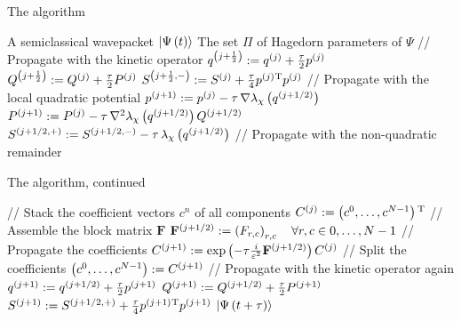 \documentclass{beamer}
\begin{document}
\begin{frame}{The algorithm}
  \begin{algorithmic}
    \REQUIRE A semiclassical wavepacket $\Ket{\Psi\left( t \right)}$
    \REQUIRE The set $\Pi$ of Hagedorn parameters of $\Psi$
    \STATE // Propagate with the kinetic operator
    \STATE $q^{\left(j+\frac{1}{2}\right)} := q^{\left(j\right)} + \frac{\tau}{2} p^{\left(j\right)}$
    \STATE $Q^{\left(j+\frac{1}{2}\right)} := Q^{\left(j\right)} + \frac{\tau}{2} P^{\left(j\right)}$
    \STATE $S^{\left(j+\frac{1}{2},-\right)} := S^{\left(j\right)} + \frac{\tau}{4} p^{\left(j\right)}{}^{\textnormal{T}} p^{\left(j\right)}$
    \STATE // Propagate with the local quadratic potential
    \STATE $p^{\left(j+1\right)} := p^{\left(j\right)} - \tau \, \nabla \lambda_\chi\left( q^{\left(j+1/2\right)} \right)$
    \STATE $P^{\left(j+1\right)} := P^{\left(j\right)} - \tau \, \nabla^2 \lambda_\chi\left( q^{\left(j+1/2\right)} \right) Q^{\left(j+1/2\right)}$
    \STATE $S^{\left(j+1/2,+\right)} := S^{\left(j+1/2,-\right)} - \tau \, \lambda_\chi\left( q^{\left(j+1/2\right)} \right)$
    \STATE // Propagate with the non-quadratic remainder
  \end{algorithmic}
\end{frame}


\begin{frame}{The algorithm, continued}
  \begin{algorithmic}
    \STATE // Stack the coefficient vectors $c^n$ of all components
    \STATE $C^{\left(j\right)} := \left(c^0, \hdots, c^{N-1}\right){}^{\textnormal{T}}$
    \STATE // Assemble the block matrix $\mathbf{F}$
    \STATE $\mathbf{F}^{\left(j+1/2\right)} := \left(F_{r,c}\right)_{r,c} \quad \forall r,c \in 0,\ldots,N-1$
    \STATE // Propagate the coefficients
    \STATE $C^{\left(j+1\right)} := \exp\left( -\tau \frac{i}{\varepsilon^2} \mathbf{F}^{\left(j+1/2\right)} \right) C^{\left(j\right)}$
    \STATE // Split the coefficients
    \STATE $\left(c^0, \ldots, c^{N-1}\right) := C^{\left(j+1\right)}$
    \STATE // Propagate with the kinetic operator again
    \STATE $q^{\left(j+1\right)} := q^{\left(j+1/2\right)} + \frac{\tau}{2} p^{\left(j+1\right)}$
    \STATE $Q^{\left(j+1\right)} := Q^{\left(j+1/2\right)} + \frac{\tau}{2} P^{\left(j+1\right)}$
    \STATE $S^{\left(j+1\right)} := S^{\left(j+1/2,+\right)} + \frac{\tau}{4} p^{\left(j+1\right)}{}^{\textnormal{T}} p^{\left(j+1\right)}$
    \RETURN $\Ket{\Psi\left( t+\tau \right)}$
  \end{algorithmic}
\end{frame}
\end{document}
